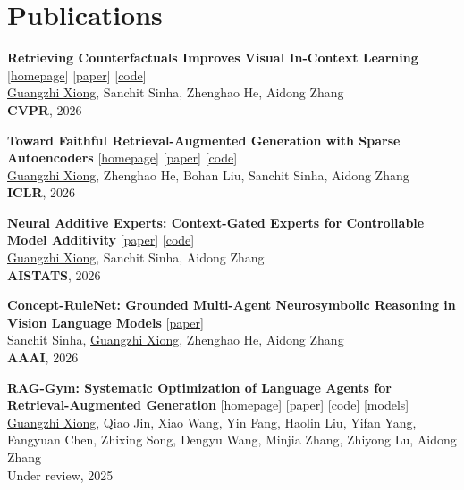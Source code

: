 \documentclass[10pt, letterpaper]{article}
\begin{document}
    \section{Publications}
        \begin{enumerate}[label={[\arabic*]}]
            
            \item \textbf{Retrieving Counterfactuals Improves Visual In-Context Learning} [\href{https://gzxiong.github.io/CIRCLES/}{homepage}] [\href{https://arxiv.org/abs/2603.16737}{paper}] [\href{https://github.com/gzxiong/CIRCLES}{code}] \\
            \underline{Guangzhi Xiong}, Sanchit Sinha, Zhenghao He, Aidong Zhang \\
            \textbf{CVPR}, 2026
            
            \item \textbf{Toward Faithful Retrieval-Augmented Generation with Sparse Autoencoders} [\href{https://gzxiong.github.io/RAGLens/}{homepage}] [\href{https://arxiv.org/abs/2512.08892}{paper}] [\href{https://github.com/gzxiong/RAGLens}{code}]\\
            \underline{Guangzhi Xiong}, Zhenghao He, Bohan Liu, Sanchit Sinha, Aidong Zhang \\
            \textbf{ICLR}, 2026
            
            \item \textbf{Neural Additive Experts: Context-Gated Experts for Controllable Model Additivity} [\href{https://arxiv.org/abs/2602.10585}{paper}] [\href{https://github.com/gzxiong/NAE}{code}]\\
            \underline{Guangzhi Xiong}, Sanchit Sinha, Aidong Zhang \\
            \textbf{AISTATS}, 2026

            \item \textbf{Concept-RuleNet: Grounded Multi-Agent Neurosymbolic Reasoning in Vision Language Models} [\href{https://arxiv.org/abs/2511.11751}{paper}] \\
            Sanchit Sinha, \underline{Guangzhi Xiong}, Zhenghao He, Aidong Zhang \\
            \textbf{AAAI}, 2026
            
            \item \textbf{RAG-Gym: Systematic Optimization of Language Agents for Retrieval-Augmented Generation} [\href{https://rag-gym.github.io/}{homepage}] [\href{https://arxiv.org/abs/2502.13957}{paper}] [\href{https://github.com/RAG-Gym/RAG-Gym}{code}] [\href{https://huggingface.co/RAG-Gym}{models}]\\
            \underline{Guangzhi Xiong}, Qiao Jin, Xiao Wang, Yin Fang, Haolin Liu, Yifan Yang, Fangyuan Chen, Zhixing Song, Dengyu Wang, Minjia Zhang, Zhiyong Lu, Aidong Zhang \\
            Under review, 2025
            

\end{enumerate}
\end{document}

